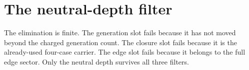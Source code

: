 \documentclass[11pt]{article}
\begin{document}
\begin{code}
\AgdaSpace{}%
\<%
\\
\>[0]\AgdaSpace{}%
\AgdaSymbol{=}\AgdaSpace{}%
\<%
\\
%
\\[\AgdaEmptyExtraSkip]%
\>[0]\AgdaSpace{}%
\AgdaSymbol{:}\AgdaSpace{}%
\AgdaSpace{}%
\AgdaSpace{}%
\AgdaSpace{}%
\<%
\\
\>[0]\AgdaSpace{}%
\AgdaSymbol{=}\AgdaSpace{}%
\<%
\\
%
\\[\AgdaEmptyExtraSkip]%
\>[0]\AgdaSpace{}%
\AgdaSymbol{:}\AgdaSpace{}%
\AgdaSpace{}%
\AgdaSpace{}%
\AgdaSpace{}%
\<%
\\
\>[0]\AgdaSpace{}%
\AgdaSymbol{=}\AgdaSpace{}%
\<%
\\
%
\\[\AgdaEmptyExtraSkip]%
\>[0]\AgdaSpace{}%
\AgdaSymbol{:}\AgdaSpace{}%
\AgdaSpace{}%
\AgdaSpace{}%
\AgdaSpace{}%
\<%
\\
\>[0]\AgdaSpace{}%
\AgdaSymbol{=}\AgdaSpace{}%
\<%
\end{code}

\section{The neutral-depth filter}

The elimination is finite.  The generation slot fails because it has
not moved beyond the charged generation count.  The closure slot fails
because it is the already-used four-case carrier.  The edge slot fails
because it belongs to the full edge sector.  Only the neutral depth
survives all three filters.
\end{document}
